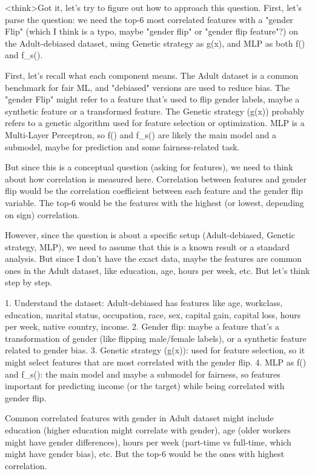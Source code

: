 <think>Got it, let's try to figure out how to approach this question. First, let's parse the question: we need the top-6 most correlated features with a "gender Flip" (which I think is a typo, maybe "gender flip" or "gender flip feature"?) on the Adult-debiased dataset, using Genetic strategy as g(x), and MLP as both f() and f_s(). 

First, let's recall what each component means. The Adult dataset is a common benchmark for fair ML, and "debiased" versions are used to reduce bias. The "gender Flip" might refer to a feature that's used to flip gender labels, maybe a synthetic feature or a transformed feature. The Genetic strategy (g(x)) probably refers to a genetic algorithm used for feature selection or optimization. MLP is a Multi-Layer Perceptron, so f() and f_s() are likely the main model and a submodel, maybe for prediction and some fairness-related task.

But since this is a conceptual question (asking for features), we need to think about how correlation is measured here. Correlation between features and gender flip would be the correlation coefficient between each feature and the gender flip variable. The top-6 would be the features with the highest (or lowest, depending on sign) correlation.

However, since the question is about a specific setup (Adult-debiased, Genetic strategy, MLP), we need to assume that this is a known result or a standard analysis. But since I don't have the exact data, maybe the features are common ones in the Adult dataset, like education, age, hours per week, etc. But let's think step by step.

1. Understand the dataset: Adult-debiased has features like age, workclass, education, marital status, occupation, race, sex, capital gain, capital loss, hours per week, native country, income.
2. Gender flip: maybe a feature that's a transformation of gender (like flipping male/female labels), or a synthetic feature related to gender bias.
3. Genetic strategy (g(x)): used for feature selection, so it might select features that are most correlated with the gender flip.
4. MLP as f() and f_s(): the main model and maybe a submodel for fairness, so features important for predicting income (or the target) while being correlated with gender flip.

Common correlated features with gender in Adult dataset might include education (higher education might correlate with gender), age (older workers might have gender differences), hours per week (part-time vs full-time, which might have gender bias), etc. But the top-6 would be the ones with highest correlation.

